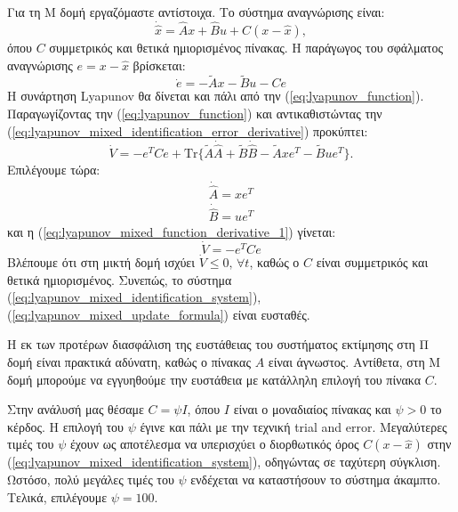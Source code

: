 \documentclass[a4paper,12pt]{article}
\begin{document}
Για τη Μ δομή εργαζόμαστε αντίστοιχα. Το σύστημα αναγνώρισης είναι:
\begin{equation}
    \dot{\hat{x}} = \hat{A}x + \hat{B} u + C(x - \hat{x}),
    \label{eq:lyapunov_mixed_identification_system}
\end{equation}
όπου $C$ συμμετρικός και θετικά ημιορισμένος πίνακας. Η παράγωγος του σφάλματος αναγνώρισης $e = x - \hat{x}$ 
βρίσκεται:
\begin{equation}
    \dot{e} = -\tilde{A}x - \tilde{B}u - Ce
    \label{eq:lyapunov_mixed_identification_error_derivative}
\end{equation}
Η συνάρτηση Lyapunov θα δίνεται και πάλι από την 
(\ref{eq:lyapunov_function}). Παραγωγίζοντας την (\ref{eq:lyapunov_function}) και αντικαθιστώντας
την (\ref{eq:lyapunov_mixed_identification_error_derivative}) προκύπτει:
\begin{equation}
    \dot{V} = -e^TCe + \mathrm{Tr}\{\tilde{A}\dot{\hat{A}} + \tilde{B}\dot{\hat{B}} - 
    \tilde{A}xe^T - \tilde{B}ue^T\}.
    \label{eq:lyapunov_mixed_function_derivative_1}  
\end{equation}
Επιλέγουμε τώρα:
\begin{equation}
    \begin{aligned}
        \dot{\hat{A}} = xe^T \\ 
        \dot{\hat{B}} = ue^T
    \end{aligned}
    \label{eq:lyapunov_mixed_update_formula}
\end{equation}
και η (\ref{eq:lyapunov_mixed_function_derivative_1}) γίνεται:
\begin{equation}
    \dot{V} = -e^TCe
    \label{eq:lyapunov_mixed_function_derivative_2}
\end{equation}
Βλέπουμε ότι στη μικτή δομή ισχύει $\dot{V} \leq 0, \, \forall t$, καθώς ο $C$ είναι συμμετρικός και θετικά
ημιορισμένος. Συνεπώς, το σύστημα (\ref{eq:lyapunov_mixed_identification_system}), 
(\ref{eq:lyapunov_mixed_update_formula}) είναι ευσταθές.

Η εκ των προτέρων διασφάλιση της ευστάθειας του συστήματος εκτίμησης στη Π δομή είναι πρακτικά αδύνατη,
καθώς ο πίνακας $A$ είναι άγνωστος. Αντίθετα, στη Μ δομή μπορούμε να εγγυηθούμε την ευστάθεια με κατάλληλη 
επιλογή του πίνακα $C$.

Στην ανάλυσή μας θέσαμε $C = \psi I$, όπου $I$ είναι ο μοναδιαίος πίνακας και $\psi > 0$ το κέρδος. 
Η επιλογή του $\psi$ έγινε και πάλι με την τεχνική 
trial and error. Μεγαλύτερες τιμές του $\psi$ έχουν ως 
αποτέλεσμα να υπερισχύει ο διορθωτικός όρος $C(x - \hat{x})$ στην 
(\ref{eq:lyapunov_mixed_identification_system}), οδηγώντας σε ταχύτερη σύγκλιση. Ωστόσο, πολύ μεγάλες τιμές 
του $\psi$ ενδέχεται να καταστήσουν το σύστημα άκαμπτο. Τελικά, επιλέγουμε $\psi = 100$.
\end{document}

